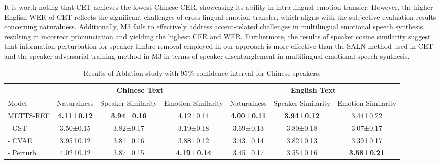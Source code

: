 \documentclass[journal,comsoc]{IEEEtran}
\begin{document}

It is worth noting that CET achieves the lowest Chinese CER, showcasing its ability in intra-lingual emotion transfer. However, the higher English WER of CET reflects the significant challenges of cross-lingual emotion transfer, which aligns with the subjective evaluation results concerning naturalness. Additionally, M3 fails to effectively address accent-related challenges in multilingual emotional speech synthesis, resulting in incorrect pronunciation and yielding the highest CER and WER. Furthermore, the results of speaker cosine similarity suggest that information perturbation for speaker timbre removal employed in our approach is more effective than the SALN method used in CET and the speaker adversarial training method in M3 in terms of speaker disentanglement in multilingual emotional speech synthesis.

\begin{table}[htb]
\centering
\caption{Results of Ablation study with 95$\%$ confidence interval for Chinese speakers.}
\label{tab_9}
\begin{tabular}{@{}l|ccc|ccc@{}}
\toprule
                             & \multicolumn{3}{c|}{Chinese Text}                            & \multicolumn{3}{c}{English Text}                      \\ \midrule
Model                        & Naturalness & Speaker Similarity & Emotion Similarity & Naturalness & Speaker Similarity & Emotion Similarity \\ \midrule
METTS-REF     & \textbf{4.11±0.12} & \textbf{3.94±0.16} & 4.12±0.14 & \textbf{4.00±0.11}  & \textbf{3.94±0.12}  & 3.44±0.22 \\
\: - GST                 & 3.50±0.15 & 3.82±0.17 & 3.19±0.18  & 3.69±0.13 & 3.80±0.18  & 3.07±0.17 \\
\: - CVAE              & 3.95±0.12 & 3.81±0.16  & 3.88±0.12 & 3.43±0.14 & 3.82±0.13  & 3.39±0.17 \\
\: - Perturb & 4.02±0.12 & 3.87±0.15 &\textbf{4.19±0.14} & 3.45±0.17 & 3.55±0.16   & \textbf{3.58±0.21} \\ \bottomrule
\end{tabular}
\end{table}
\end{document}
